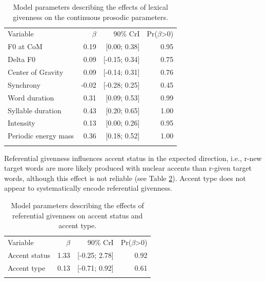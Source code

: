 \begin{table}[]
\begin{tabular}{lrrr}
\lsptoprule
\multicolumn{4}{c}{Lexical givenness} \\ \hline
Variable    & $\beta$ & 90\% CrI  & Pr($\beta$\textgreater{}0) \\ \hline
F0 at CoM    & 0.19       & {[}0.00; 0.38{]}  & 0.95                          \\
Delta F0    & 0.09       & {[}-0.15; 0.34{]}  & 0.75                          \\
Center of Gravity            & 0.09       & {[}-0.14; 0.31{]}  & 0.76                          \\
Synchrony            & -0.02       & {[}-0.28; 0.25{]}  & 0.45                          \\
Word duration            & 0.31       & {[}0.09; 0.53{]}  & 0.99                          \\
Syllable duration & 0.43       & {[}0.20; 0.65{]}  & 1.00                             \\
Intensity             & 0.13       & {[}0.00; 0.26{]} & 0.95                          \\
Periodic energy mass         & 0.36       & {[}0.18; 0.52{]} & 1.00                          \\
\lspbottomrule
\end{tabular}
\caption{Model parameters describing the effects of lexical givenness on the continuous prosodic parameters.}
\label{table:model_parameters_lexical_givenness}
\end{table}

Referential givenness influences accent status in the expected direction, i.e., r-new target words are more likely produced with nuclear accents than r-given target words, although this effect is not reliable (see Table \ref{table:model_parameterscat_referential_givenness}). Accent type does not appear to systematically encode referential givenness.

\begin{table}[]
\begin{tabular}{lrrr}
\lsptoprule
\multicolumn{4}{c}{Referential givenness} \\ \hline
Variable    & $\beta$ & 90\% CrI  & Pr($\beta$\textgreater{}0) \\ \hline
Accent status    & 1.33       & {[}-0.25; 2.78{]}  & 0.92                         \\
Accent type        & 0.13       & {[}-0.71; 0.92{]} & 0.61                          \\
\lspbottomrule
\end{tabular}
\caption{Model parameters describing the effects of referential givenness on accent status and accent type.}
\label{table:model_parameterscat_referential_givenness}
\end{table}


